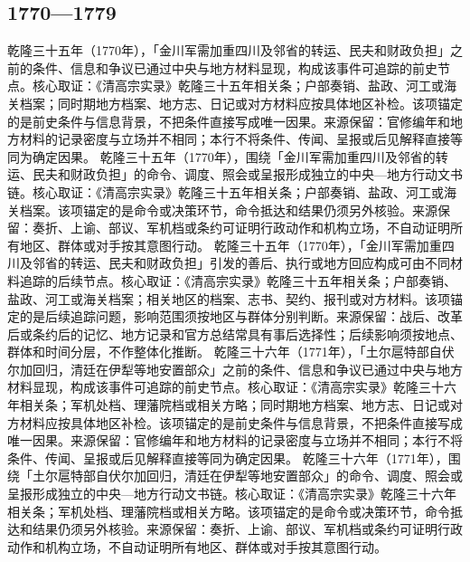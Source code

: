 \subsection{1770—1779}
乾隆三十五年（1770年），「金川军需加重四川及邻省的转运、民夫和财政负担」之前的条件、信息和争议已通过中央与地方材料显现，构成该事件可追踪的前史节点。核心取证：《清高宗实录》乾隆三十五年相关条；户部奏销、盐政、河工或海关档案；同时期地方档案、地方志、日记或对方材料应按具体地区补检。该项锚定的是前史条件与信息背景，不把条件直接写成唯一因果。来源保留：官修编年和地方材料的记录密度与立场并不相同；本行不将条件、传闻、呈报或后见解释直接等同为确定因果。
乾隆三十五年（1770年），围绕「金川军需加重四川及邻省的转运、民夫和财政负担」的命令、调度、照会或呈报形成独立的中央—地方行动文书链。核心取证：《清高宗实录》乾隆三十五年相关条；户部奏销、盐政、河工或海关档案。该项锚定的是命令或决策环节，命令抵达和结果仍须另外核验。来源保留：奏折、上谕、部议、军机档或条约可证明行政动作和机构立场，不自动证明所有地区、群体或对手按其意图行动。
乾隆三十五年（1770年），「金川军需加重四川及邻省的转运、民夫和财政负担」引发的善后、执行或地方回应构成可由不同材料追踪的后续节点。核心取证：《清高宗实录》乾隆三十五年相关条；户部奏销、盐政、河工或海关档案；相关地区的档案、志书、契约、报刊或对方材料。该项锚定的是后续追踪问题，影响范围须按地区与群体分别判断。来源保留：战后、改革后或条约后的记忆、地方记录和官方总结常具有事后选择性；后续影响须按地点、群体和时间分层，不作整体化推断。
乾隆三十六年（1771年），「土尔扈特部自伏尔加回归，清廷在伊犁等地安置部众」之前的条件、信息和争议已通过中央与地方材料显现，构成该事件可追踪的前史节点。核心取证：《清高宗实录》乾隆三十六年相关条；军机处档、理藩院档或相关方略；同时期地方档案、地方志、日记或对方材料应按具体地区补检。该项锚定的是前史条件与信息背景，不把条件直接写成唯一因果。来源保留：官修编年和地方材料的记录密度与立场并不相同；本行不将条件、传闻、呈报或后见解释直接等同为确定因果。
乾隆三十六年（1771年），围绕「土尔扈特部自伏尔加回归，清廷在伊犁等地安置部众」的命令、调度、照会或呈报形成独立的中央—地方行动文书链。核心取证：《清高宗实录》乾隆三十六年相关条；军机处档、理藩院档或相关方略。该项锚定的是命令或决策环节，命令抵达和结果仍须另外核验。来源保留：奏折、上谕、部议、军机档或条约可证明行政动作和机构立场，不自动证明所有地区、群体或对手按其意图行动。
